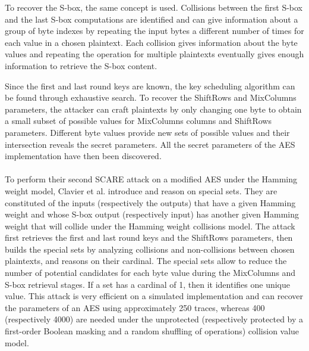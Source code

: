 \documentclass[11pt]{sdm}
\begin{document}
To recover the S-box, the same concept is used.
Collisions between the first S-box and the last S-box computations are identified and can give information about a group of byte indexes by repeating the input bytes a different number of times for each value in a chosen plaintext.
Each collision gives information about the byte values and repeating the operation for multiple plaintexts eventually gives enough information to retrieve the S-box content.

Since the first and last round keys are known, the key scheduling algorithm can be found through exhaustive search.
To recover the ShiftRows and MixColumns parameters, the attacker can craft plaintexts by only changing one byte to obtain a small subset of possible values for MixColumns columns and ShiftRows parameters.
Different byte values provide new sets of possible values and their intersection reveals the secret parameters.
All the secret parameters of the AES implementation have then been discovered.

\paragraph{}
To perform their second SCARE attack on a modified AES under the Hamming weight model, Clavier et al. introduce and reason on special sets.
They are constituted of the inputs (respectively the outputs) that have a given Hamming weight and whose S-box output (respectively input) has another given Hamming weight that will collide under the Hamming weight collisions model.
The attack first retrieves the first and last round keys and the ShiftRows parameters, then builds the special sets by analyzing collisions and non-collisions between chosen plaintexts, and reasons on their cardinal.
The special sets allow to reduce the number of potential candidates for each byte value during the MixColumns and S-box retrieval stages.
If a set has a cardinal of 1, then it identifies one unique value.
This attack is very efficient on a simulated implementation and can recover the parameters of an AES using approximately 250 traces, whereas 400 (respectively 4000) are needed under the unprotected (respectively protected by a first-order Boolean masking and a random shuffling of operations) collision value model.


\end{document}
